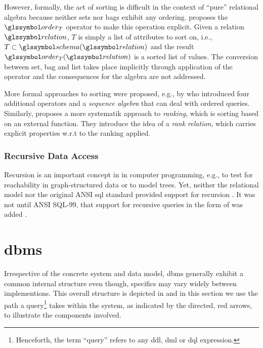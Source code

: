 However, formally, the act of sorting is difficult in the context of ``pure'' relational algebra because neither sets nor bags exhibit any ordering. \cite{Garcia:2009Database} proposes the $\order_T$ operator to make this operation explicit. Given a relation $\relation$, $T$ is simply a list of attributes to sort on, i.e., $T \subset \schema(\relation)$ and the result $\order_T (\relation)$ is a sorted list of values. The conversion between set, bag and list takes place implicitly through application of the operator and the consequences for the algebra are not addressed.

More formal approaches to sorting were proposed, e.g., by \cite{Ramakrsihnan:1998SRQL} who introduced four additional operators and a \emph{sequence algebra} that can deal with ordered queries. Similarly, \cite{Chengkai:2005RankSQL} proposes a more systematik approach to \emph{ranking}, which is sorting based on an external function. They introduce the idea of a \emph{rank relation}, which carries explicit properties w.r.t to the ranking applied.

\subsubsection{Recursive Data Access}

Recursion is an important concept in in computer programming, e.g., to test for reachability in graph-structured data or to model trees. Yet, neither the relational model nor the original ANSI \acrshort{sql} \cite{XOpen:1996SQL} standard provided support for recursion \cite{Libkin:2003Expressive}. It was not until ANSI SQL-99, that support for recursive queries in the form of  was added \cite{Przymus:2010Recursive}.

\section{\texorpdfstring{\acrfull{dbms}}{Database Management System (DBMS)}}
Irrespective of the concrete system and data model, \acrshort{dbms} generally exhibit a common internal structure \cite{Petrov:2019Database,Hellerstein:2007Architecture} even though, specifics may vary widely between implementions. This overall structure is depicted in  and in this section we use the path a query\footnote{Henceforth, the term ``query'' refers to any \acrshort{ddl}, \acrshort{dml} or \acrshort{dql} expression.} takes within the system, as indicated by the directed, red arrows, to illustrate the components involved.

